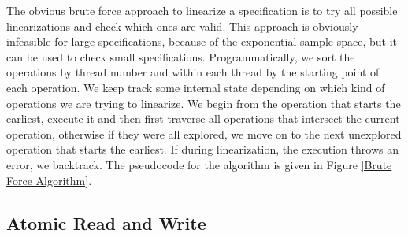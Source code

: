 \documentclass[oneside, a4paper, onecolumn, 10pt]{article}
\begin{document}
The obvious brute force approach to linearize a specification is to try all possible linearizations and check which ones are valid. This approach is obviously infeasible for large specifications, because of the exponential sample space, but it can be used to check small specifications. Programmatically, we sort the operations by thread number and within each thread by the starting point of each operation. We keep track some internal state depending on which kind of operations we are trying to linearize. We begin from the operation that starts the earliest, execute it and then first traverse all operations that intersect the current operation, otherwise if they were all explored, we move on to the next unexplored operation that starts the earliest. If during linearization, the execution throws an error, we backtrack. The pseudocode for the algorithm is given in Figure \ref{Brute Force Algorithm}.

\subsection{Atomic Read and Write}
\end{document}

